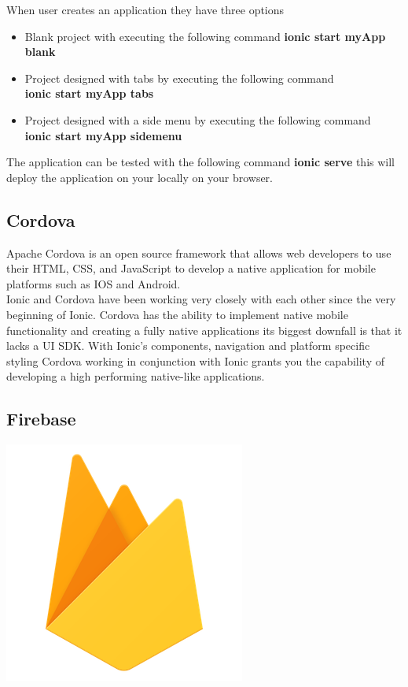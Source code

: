 \documentclass[a4paper,12pt]{report}
\begin{document}
When user creates an application they have three options 
\begin{itemize}
    \item Blank project with executing the following command \textbf{ionic start myApp blank}
    \item Project designed with tabs by executing the following command\\ \textbf{ionic start myApp tabs}
    \item Project designed with a side menu by executing the following command\\ \textbf{ionic start myApp sidemenu}
\end{itemize}

The application can be tested with the following command \textbf{ionic serve} this will deploy the application on your locally on your browser.\cite{ionicRun}

\subsection{Cordova}
Apache Cordova is an open source framework that allows web developers to use their HTML, CSS, and JavaScript to develop a native application for mobile platforms such as IOS and Android.\\

Ionic and Cordova have been working very closely with each other since the very beginning of Ionic. Cordova has the ability to implement native mobile functionality and creating a fully native applications its biggest downfall is that it lacks a UI SDK.
With Ionic's components, navigation and platform specific styling Cordova working in conjunction with Ionic grants you the capability of developing a high performing native-like applications.\cite{cordovaInsight}

\subsection{Firebase} 
\includegraphics[scale=.05]{images/firebase.png}
\end{document}
